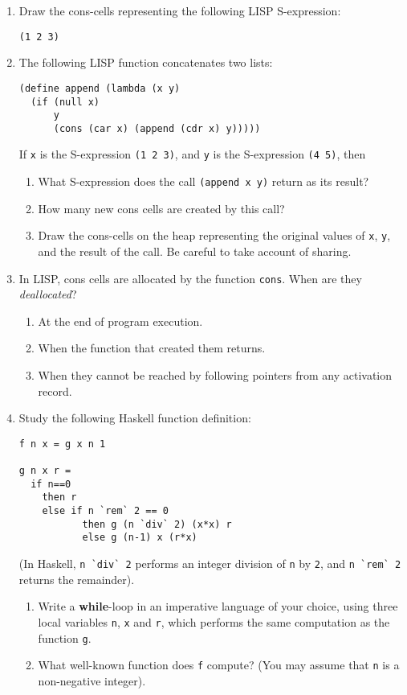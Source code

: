 \documentclass{article}
\begin{document}
\begin{enumerate}

\item
Draw the cons-cells representing the following LISP S-expression:
\begin{verbatim}
(1 2 3)
\end{verbatim}

\item
The following LISP function concatenates two lists:
\begin{verbatim}
(define append (lambda (x y)
  (if (null x)
      y
      (cons (car x) (append (cdr x) y)))))
\end{verbatim}
If \verb!x! is the S-expression \verb!(1 2 3)!, and \verb!y! is the S-expression \verb!(4 5)!, then
\begin{enumerate}
\item What S-expression does the call \verb!(append x y)! return as its result?
\item How many new cons cells are created by this call?
\item Draw the cons-cells on the heap representing the original values
  of \verb!x!, \verb!y!, and the result of the call. Be careful to
  take account of sharing.
\end{enumerate}

\item
In LISP, cons cells are allocated by the function \verb!cons!. When are they {\em deallocated}?
\begin{enumerate}
\item At the end of program execution.
\item When the function that created them returns.
\item When they cannot be reached by following pointers from any
  activation record.
\end{enumerate}

\item
Study the following Haskell function definition:
\begin{verbatim}
f n x = g x n 1

g n x r =
  if n==0 
    then r
    else if n `rem` 2 == 0 
    	   then g (n `div` 2) (x*x) r
           else g (n-1) x (r*x)
\end{verbatim}
(In Haskell, \verb!n `div` 2! performs an integer division of \verb!n! by \verb!2!, and \verb!n `rem` 2! returns the remainder).

\begin{enumerate}
\item
Write a {\bf while}-loop in an imperative language of your choice,
using three local variables \verb!n!, \verb!x! and \verb!r!, which performs the same computation as the function \verb!g!.
\item
What well-known function does \verb!f! compute? (You may assume that \verb!n! is a non-negative integer).
\end{enumerate}


\end{enumerate}
\end{document}
